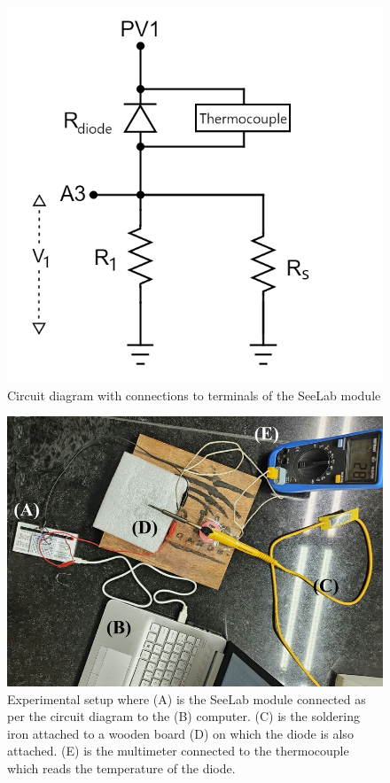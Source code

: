 \begin{figure}
    \centering
    \includegraphics[width=.8\columnwidth]{images/circuit.png}
    \caption{Circuit diagram with connections to terminals of the SeeLab module}
    \label{c1}
\end{figure}

\begin{figure}
    \centering
    \includegraphics[width=1.3\columnwidth]{images/pic.jpg}
    \caption{Experimental setup where (A) is the SeeLab module connected as per the circuit diagram to the (B) computer. (C) is the soldering iron attached to a wooden board (D) on which the diode is also attached. (E) is the multimeter connected to the thermocouple which reads the temperature of the diode.}
    \label{c2}
\end{figure}

